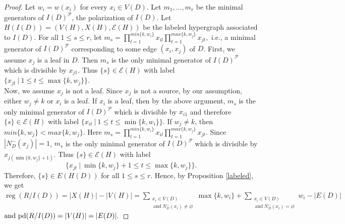 \documentclass[11pt,reqno]{amsart}
\let\emptyset\varnothing
\newcommand{\pd}{\operatorname{pd}}
\newcommand{\reg}{\operatorname{reg}}
\theoremstyle{definition}
\begin{document}
\begin{proof}
Let $ w_i=w(x_i)  $ for every $x_i \in V(D).$	Let  $m_1, \ldots, m_r$ be the minimal
	generators of $I(D)^\mathcal{P}$, the polarization of $I(D)$. Let $ H(I(D)) = (V(H), X(H), \mathcal{E}(H)) $ be the labeled hypergraph associated to $I(D)$. For all $1 \leq  s \leq r$,  let  $\displaystyle{ m_s= \prod_{l=1}^{min\{k,{w_{i}}\}}x_{{i}l}\prod_{t=1}^{max\{k,{w_{j}}\}}x_{{j}t}}, $  i.e., a minimal generator of $ I(D)^\mathcal{P} $ corresponding to some edge $(x_{i},x_{j})$ of $D$.  First, we assume  $ x_{j} $ is a leaf in  $ D $. Then $ m_s $
	is the only minimal generator of $ I(D)^{\mathcal{P}} $
	which is divisible by $ x_{{j}1} $. Thus  $ \{s\} \in \mathcal{E} (H) $ with label $ \{x_{{j}t}~|~1 \leq t \leq {\max\{k,{w_{j}}\}} \}. $  
\vspace*{0.2cm}\\	 
Now, we assume  $x_j$ is not a leaf.    Since $x_j$ is not a source,  by our assumption,  either $w_j \neq k$ or $x_i$ is a leaf. If $x_i$ is a leaf, then by the above argument, $m_s$ is the only minimal generator of $I(D)^{\mathcal{P}}$ which is divisible by $x_{i1}$  and therefore $ \{s\} \in \mathcal{E} (H)  $ with label $ \{x_{{i}t}~|~1 \leq t \leq {\min\{k,{w_{i}}\}} \}. $  
If $w_j \neq k$, then ${min\{k,{w_{j}}\}}   < {max\{k,{w_{j}}\}}$.
Here  $\displaystyle{ m_s= \prod_{l=1}^{min\{k,{w_{i}}\}}x_{{i}l}\prod_{t=1}^{max\{k,{w_{j}}\}}x_{{j}t}} $.  Since $|N_D^-(x_j)| = 1  $,    $ m_s $
 is the only minimal generator of $ I(D)^{\mathcal{P}} $
 which is divisible by $ x_{j({\min\{k,{w_{j}}\}+1})} $. Thus $ \{s\} \in \mathcal{E} (H)  $ with label $$ \{x_{{j}t}~|~{\min\{k,{w_{j}}\}+1} \leq t \leq {\max\{k,{w_{j}}\}} \}. $$ Therefore, $\{s\}  \in   E(H(D))$ for all $1 \leq s \leq r$. Hence, by Proposition \ref{labeled}, we get
 \vspace{0.2cm}\\
$\displaystyle{  \reg(R/I(D)) = |X(H)| - |V (H)| = \sum_{\substack{x_i \in V(D)\\~\mbox{and}~N^{-}_D(x_i) \neq \emptyset}} {{\max\{k,{w_{i}}\}}} + \sum_{\substack{x_i \in V(D)\\~\mbox{and}~N^{-}_D(x_i) = \emptyset}} {{{w_{i}}}}-|E(D)|}  $ 
 \vspace{0.2cm}\\	
$\hspace*{0cm}\mbox{and}~\displaystyle{  \pd(R/I(D)) =    |V (H)|  = |E(D)|}  .$
\end{proof}
\end{document}
